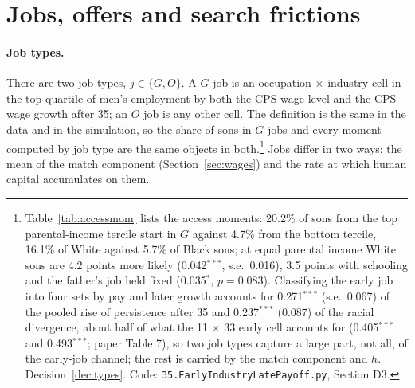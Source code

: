 \documentclass[11pt]{article}
\newcommand{\code}[1]{\texttt{#1}}
\newcommand{\1}{\mathbf{1}}
\begin{document}
\section{Jobs, offers and search frictions}\label{sec:jobs}

\paragraph{Job types.} There are two job types, $j \in \{G, O\}$. A $G$ job is an occupation $\times$ industry cell in
the top quartile of men's employment by both the CPS wage level and the CPS wage growth after 35; an $O$ job is any
other cell. The definition is the same in the data and in the simulation, so the share of sons in $G$ jobs and every
moment computed by job type are the same objects in both.\footnote{Table~\ref{tab:accessmom} lists the access moments:
20.2\% of sons from the top parental-income tercile start in $G$ against 4.7\% from the bottom tercile, 16.1\% of White
against 5.7\% of Black sons; at equal parental income White sons are 4.2 points more likely (0.042$^{***}$, s.e.\
0.016), 3.5 points with schooling and the father's job held fixed (0.035$^{*}$, $p=0.083$). Classifying the early job into
four sets by pay and later growth accounts for 0.271$^{***}$ (s.e.\ 0.067) of the pooled rise of persistence after 35 and
0.237$^{***}$ (0.087) of the racial divergence, about half of what the 11 $\times$ 33 early cell accounts for (0.405$^{***}$
and 0.493$^{***}$; paper Table 7), so two job types capture a large part, not all, of the early-job channel; the rest is
carried by the match component and $h$. Decision~\ref{dec:types}. Code: \code{35.EarlyIndustryLatePayoff.py}, Section D3.} Jobs differ in two ways: the mean of the match
component (Section~\ref{sec:wages}) and the rate at which human capital accumulates on them.
\end{document}
